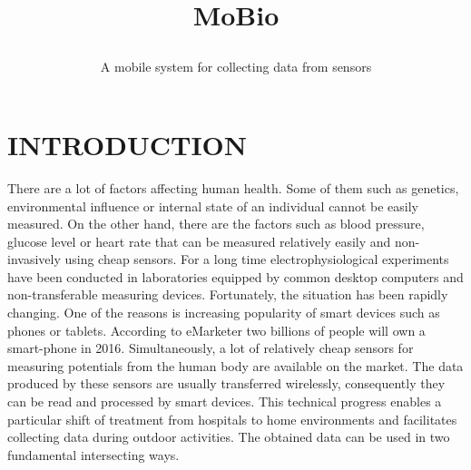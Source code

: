 \documentclass[a4paper,twoside]{article}
\begin{document}
\title{MoBio\subtitle{A mobile system for collecting data from sensors} }

\author{
}



\onecolumn \maketitle \normalsize \vfill

\section{\uppercase{Introduction}}
\label{sec:introduction}

\noindent
There are a lot of factors affecting human health. Some of them such as genetics, environmental influence or internal state of an individual cannot be easily measured. On the other hand, there are the factors such as blood pressure, glucose level or heart rate that can be measured relatively easily and non-invasively using cheap sensors. For a long time electrophysiological experiments have been conducted in laboratories equipped by common desktop computers and non-transferable measuring devices. Fortunately, the situation has been rapidly changing. One of the reasons is increasing popularity of smart devices such as phones or tablets. According to eMarketer \cite{emark} two billions of people will own a smart-phone in 2016. Simultaneously, a lot of relatively cheap sensors for measuring potentials from the human body are available on the market. The data produced by these sensors are usually transferred wirelessly, consequently they can be read and processed by smart devices. This technical progress enables a particular shift of treatment from hospitals to home environments and facilitates collecting data during outdoor activities. The obtained data can be used in two fundamental intersecting ways.
\end{document}
